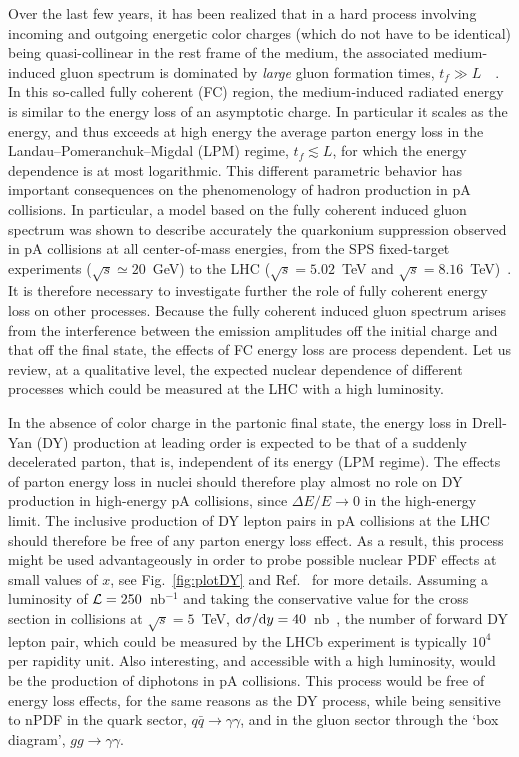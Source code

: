 \documentclass[../report.tex]{subfiles}
\begin{document}
Over the last few years, it has been realized that in a hard process involving incoming and outgoing energetic color charges (which do not have to be identical) being quasi-collinear in the rest frame of the medium, the associated medium-induced gluon spectrum is dominated by {\it large} gluon formation times, $t_f \gg L$~~\cite{Arleo:2010rb,Peigne:2014rka,Peigne:2014uha}. In this so-called fully coherent (FC) region, the medium-induced radiated energy is similar to the energy loss of an asymptotic charge. In particular it scales as the energy, and thus exceeds at high energy the average parton energy loss in the Landau--Pomeranchuk--Migdal (LPM) regime, $t_f \lesssim L$, for which the energy dependence is at most logarithmic.
%
This different parametric behavior has important consequences on the phenomenology of hadron production in pA collisions. In particular, a model based on the fully coherent induced gluon spectrum was shown to describe accurately the quarkonium suppression observed in pA collisions at all center-of-mass energies, from the SPS fixed-target experiments ($\sqrt{s}\simeq 20$~GeV) to the LHC ($\sqrt{s}=5.02$~TeV and $\sqrt{s}=8.16$~TeV)~\cite{Arleo:2012hn,Arleo:2012rs,Arleo:2013zua}. It is therefore necessary to investigate further the role of fully coherent energy loss on other processes.
%
Because the fully coherent induced gluon spectrum arises from the interference between the emission amplitudes off the initial charge and that off the final state, the effects of FC energy loss are process dependent. Let us review, at a qualitative level, the expected nuclear dependence of different processes which could be measured at the LHC with a high luminosity.

In the absence of color charge in the partonic final state, the energy loss in Drell-Yan (DY) production at leading order is expected to be that of a suddenly decelerated parton, that is, independent of its energy (LPM regime). The effects of parton energy loss in nuclei should therefore play almost no role on DY production in high-energy pA collisions, since $\Delta E / E \to 0$ in the high-energy limit. The inclusive production of DY lepton pairs in pA collisions at the LHC should therefore be free of any parton energy loss effect. As a result, this process might be used advantageously in order to probe possible nuclear PDF effects at small values of $x$, see \eg Fig.~\ref{fig:plotDY} and Ref.~\cite{Arleo:2015qiv} for more details. Assuming a luminosity of ${\cal L}=250$~nb$^{-1}$ and taking the conservative value for the cross section in \pPb collisions at $\sqrt{s}=5$~TeV, ${\rm \mathrm{d} }\sigma/\mathrm{d} y=40$~nb~\cite{Arleo:2015qiv}, the number of forward DY lepton pair, which could be measured by the LHCb experiment is typically $10^4$ per rapidity unit. Also interesting, and accessible with a high luminosity, would be the production of diphotons in pA collisions. This process would be free of energy loss effects, for the same reasons as the DY process, while being sensitive to nPDF in the quark sector, $q\bar{q} \to \gamma\gamma$, and in the gluon sector through the `box diagram', $gg \to \gamma\gamma$.
\end{document}
